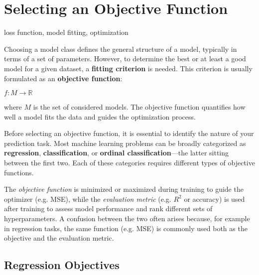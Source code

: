 \documentclass[12pt,openany]{book}
\begin{document}
\section{Selecting an Objective Function}

\begin{keywordsbox}
loss function, model fitting, optimization
\end{keywordsbox}


Choosing a model class defines the general structure of a model, 
typically in terms of a set of parameters. However, to determine 
the best or at least a good model for a given dataset, a 
\textbf{fitting criterion} is needed. This criterion is usually 
formulated as an \textbf{objective function}:

\ensuremath{f : M \to \mathbb{R}}

where \( M \) is the set of considered models. The objective function 
quantifies how well a model fits the data and guides the optimization 
process.

Before selecting an objective function, it is essential to identify 
the nature of your prediction task. Most machine learning problems 
can be broadly categorized as \textbf{regression}, 
\textbf{classification}, or \textbf{ordinal classification}—the latter 
sitting between the first two. Each of these categories requires 
different types of objective functions.

\begin{notebox}
The \textit{objective function} is minimized or maximized during training 
to guide the optimizer (e.g. MSE), while the \textit{evaluation metric} 
(e.g. $R^2$ or accuracy) is used after training to assess model performance 
and rank different sets of hyperparameters. A confusion between the two 
often arises because, for example in regression tasks, the same function (e.g. MSE) is 
commonly used both as the objective and the evaluation metric.
\end{notebox}


\subsection{Regression Objectives}
\end{document}
